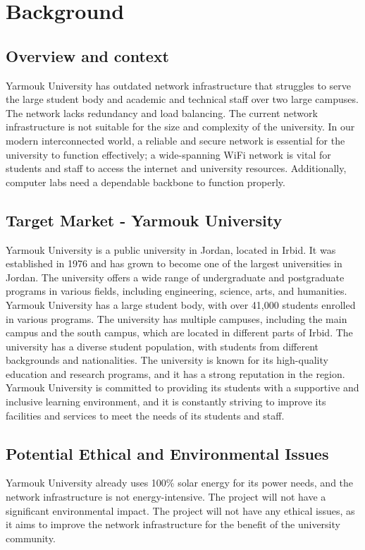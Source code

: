 \documentclass[12pt]{report}
\begin{document}

\chapter{Background}
\section{Overview and context}

Yarmouk University has outdated network infrastructure that struggles to serve the large student body and academic and technical staff over two large campuses. The network lacks redundancy and load balancing. The current network infrastructure is not suitable for the size and complexity of the university. In our modern interconnected world, a reliable and secure network is essential for the university to function effectively; a wide-spanning WiFi network is vital for students and staff to access the internet and university resources. Additionally, computer labs need a dependable backbone to function properly.
\section{Target Market - Yarmouk University}
Yarmouk University is a public university in Jordan, located in Irbid. It was established in 1976 and has grown to become one of the largest universities in Jordan. The university offers a wide range of undergraduate and postgraduate programs in various fields, including engineering, science, arts, and humanities. Yarmouk University has a large student body, with over 41,000 students enrolled in various programs. The university has multiple campuses, including the main campus and the south campus, which are located in different parts of Irbid. The university has a diverse student population, with students from different backgrounds and nationalities. The university is known for its high-quality education and research programs, and it has a strong reputation in the region. Yarmouk University is committed to providing its students with a supportive and inclusive learning environment, and it is constantly striving to improve its facilities and services to meet the needs of its students and staff.

\section{Potential Ethical and Environmental Issues}
Yarmouk University already uses 100\% solar energy for its power needs, and the network infrastructure is not energy-intensive. The project will not have a significant environmental impact. The project will not have any ethical issues, as it aims to improve the network infrastructure for the benefit of the university community.
\end{document}
